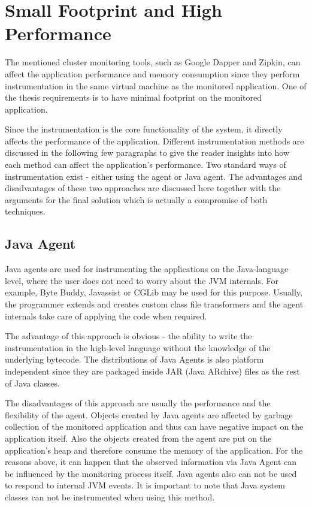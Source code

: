 \section{Small Footprint and High Performance}
The mentioned cluster monitoring tools, such as Google Dapper and Zipkin, can affect the application performance and memory consumption since they perform instrumentation in the same virtual machine as the monitored application. One of the thesis requirements is to have minimal footprint on the monitored application.

Since the instrumentation is the core functionality of the system, it directly affects the performance of the application. Different instrumentation methods are discussed in the following few paragraphs to give the reader insights into how each method can affect the application's performance. Two standard ways of instrumentation exist - either using the agent or Java agent. The advantages and disadvantages of these two approaches are discussed here together with the arguments for the final solution which is actually a compromise of both techniques.
\subsection{Java Agent}
\label{java_agent}
Java agents are used for instrumenting the applications on the Java-language level, where the user does not need to worry about the JVM internals. For example, Byte Buddy, Javassist or CGLib may be used for this purpose. Usually, the programmer extends and creates custom class file transformers and the agent internals take care of applying the code when required. 

The advantage of this approach is obvious - the ability to write the instrumentation in the high-level language without the knowledge of the underlying bytecode. The distributions of Java Agents is also platform independent since they are packaged inside JAR (Java ARchive) files as the rest of Java classes. 

The disadvantages of this approach are usually the performance and the flexibility of the agent. Objects created by Java agents are affected by garbage collection of the monitored application and thus can have negative impact on the application itself. Also the objects created from the agent are put on the application's heap and therefore consume the  memory of the application. For the reasons above, it can happen that the observed information via Java Agent can be influenced by the monitoring process itself. Java agents also can not be used to respond to internal JVM events. It is important to note that Java system classes can not be instrumented when using this method.
